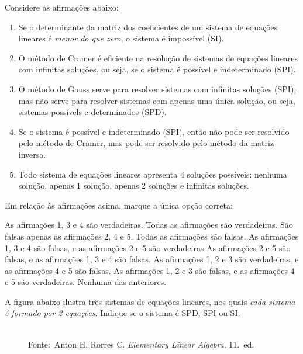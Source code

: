 \documentclass[pdftex, brazil, 12pt, oneside, addpoints]{exam}
\begin{document}
\begin{questions}
\question
Considere as afirmações abaixo:
\begin{enumerate}[noitemsep]
  \item Se o determinante da matriz dos coeficientes de um sistema de
    equações lineares é \emph{menor do que zero}, o sistema é
    impossível (SI).
  \item O método de Cramer é eficiente na resolução de sistemas de
    equações lineares com infinitas soluções, ou seja, se o sistema
    é possível e indeterminado (SPI).
  \item O método de Gauss serve para resolver sistemas com infinitas
    soluções (SPI), mas não serve para resolver sistemas com apenas
    uma única solução, ou seja, sistemas possívels e determinados
    (SPD).
  \item Se o sistema é possível e indeterminado (SPI), então não pode ser
    resolvido pelo método de Cramer, mas pode ser resolvido pelo
    método da matriz inversa.
  \item Todo sistema de equações lineares apresenta 4 soluções
     possíveis: nenhuma solução, apenas 1 solução, apenas 2 soluções e
     infinitas soluções.
\end{enumerate}
Em relação às afirmações acima, marque a única opção correta:
\begin{checkboxes}
  \choice As afirmações 1, 3 e 4 são verdadeiras.
  \choice Todas as afirmações são verdadeiras.
  \choice São falsas apenas as afirmações 2, 4 e 5.
  \CorrectChoice Todas as afirmações são falsas.
  \choice As afirmações 1, 3 e 4 são falsas, e as afirmações 2 e 5 são
  verdadeiras
  \choice As afirmações 2 e 5 são falsas, e as afirmações 1, 3 e 4 são
  falsas.
  \choice As afirmações 1, 2 e 3 são verdadeiras, e as afirmações 4 e
  5 são falsas.
  \choice As afirmações 1, 2 e 3 são falsas, e as afirmações 4 e 5 são
  verdadeiras.
  \choice Nenhuma das anteriores.
\end{checkboxes}

\ifprintanswers
\else
\newpage
\fi

\question
A figura abaixo ilustra três sistemas de
equações lineares, nos quais \emph{cada sistema é formado por 2
equações}. Indique se o sistema é SPD, SPI ou SI.
\begin{figure}[H]
  \begin{center}
    \\
    \footnotesize{Fonte:~Anton H, Rorres C. \emph{Elementary Linear Algebra}, 11.\ ed.}
  \end{center}
\end{figure}
\vspace{-0.5cm}
\begin{parts}

\end{parts}
\end{questions}
\end{document}
